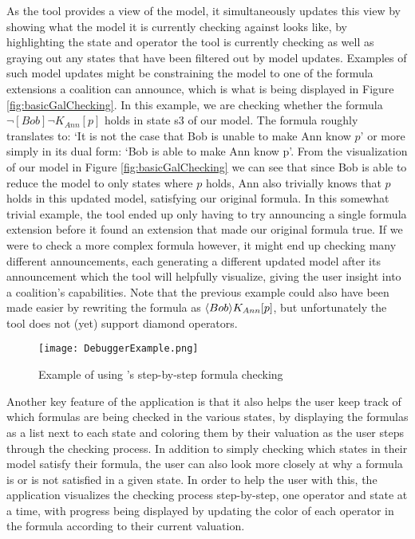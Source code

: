 As the tool provides a view of the model, it simultaneously updates this view by showing what the model it is currently checking against looks like, by highlighting the state and operator the tool is currently checking as well as graying out any states that have been filtered out by model updates. Examples of such model updates might be constraining the model to one of the formula extensions a coalition can announce, which is what is being displayed in Figure \ref{fig:basicGalChecking}. In this example, we are checking whether the formula $\neg [Bob]\neg K_{Ann}[p]$ holds in state s3 of our model. The formula roughly translates to: `It is not the case that Bob is unable to make Ann know $p$' or more simply in its dual form: `Bob is able to make Ann know p'. From the visualization of our model in Figure \ref{fig:basicGalChecking} we can see that since Bob is able to reduce the model to only states where $p$ holds, Ann also trivially knows that $p$ holds in this updated model, satisfying our original formula. In this somewhat trivial example, the tool ended up only having to try announcing a single formula extension before it found an extension that made our original formula true. If we were to check a more complex formula however, it might end up checking many different announcements, each generating a different updated model after its announcement which the tool will helpfully visualize, giving the user insight into a coalition's capabilities. Note that the previous example could also have been made easier by rewriting the formula as $\langle Bob\rangle K_{Ann}[p]$, but unfortunately the tool does not (yet) support diamond operators. 

\begin{figure}[h]
	\label{fig:debugExmpl}
	\caption{Example of using \cname's step-by-step formula checking}
	\texttt{[image: DebuggerExample.png]}
\end{figure}


Another key feature of the application is that it also helps the user keep track of which formulas are being checked in the various states, by displaying the formulas as a list next to each state and coloring them by their valuation as the user steps through the checking process. In addition to simply checking which states in their model satisfy their formula, the user can also look more closely at why a formula is or is not satisfied in a given state. In order to help the user with this, the application visualizes the checking process step-by-step, one operator and state at a time, with progress being displayed by updating the color of each operator in the formula according to their current valuation.


